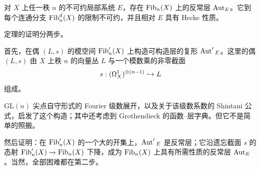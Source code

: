 
\begin{theorem}[Drinfeld 于 $n=2$，{[Dr 2]}；一般情形由 Frenkel、Gaitsgory 与 Vilonen 给出，{[F-G-V 2]} 与 {[Ga]}]
对 $X$ 上任一秩 $n$ 的不可约局部系统 $E$，存在 $\operatorname{Fib}_n(X)$ 上的反常层 $\operatorname{Aut}_E$。它到每个连通分支 $\operatorname{Fib}_n^d(X)$ 的限制不可约，并且相对 $E$ 具有 Hecke 性质。
\end{theorem}

定理的证明分两步。

首先，在偶 $(L,s)$ 的模空间 $\operatorname{Fib}'_n(X)$ 上构造可构造层的复形 $\operatorname{Aut}'{}_E$。这里的偶 $(L,s)$ 由 $X$ 上秩 $n$ 的向量丛 $L$ 与一个模数乘的非零截面
\[
  s : (\Omega^{1}_{X})^{\otimes(n-1)} \hookrightarrow L
\]
组成。

$\mathrm{GL}(n)$ 尖点自守形式的 Fourier 级数展开，以及关于该级数系数的 Shintani 公式，启发了这个构造；其中还考虑到 Grothendieck 的函数–层字典。但它不是简单的照搬。

然后证明：在 $\operatorname{Fib}'_n(X)$ 的一个大的开集上，$\operatorname{Aut}'{}_E$ 是反常层；它沿遗忘截面 $s$ 的态射 $\operatorname{Fib}'_n(X)\to\operatorname{Fib}_n(X)$ 下降，成为 $\operatorname{Fib}_n(X)$ 上具有所需性质的反常层 $\operatorname{Aut}_E$。当然，全部困难都在第二步。
